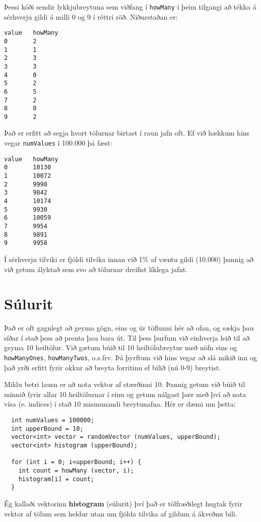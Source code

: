 Þessi kóði sendir lykkjubreytuna sem viðfang í {\tt howMany} í þeim tilgangi að tékka á sérhverju gildi á milli 0 og 9 í réttri röð.
Niðurstaðan er:

\begin{verbatim}
value   howMany
0       2
1       1
2       3
3       3
4       0
5       2
6       5
7       2
8       0
9       2
\end{verbatim}
%
Það er erfitt að segja hvort tölurnar birtast í raun jafn oft.
Ef við hækkum hins vegar {\tt numValues} í 100.000 þá fæst:

\begin{verbatim}
value   howMany
0       10130
1       10072
2       9990
3       9842
4       10174
5       9930
6       10059
7       9954
8       9891
9       9958
\end{verbatim}
%
Í sérhverju tilviki er fjöldi tilvika innan við 1\% af væntu gildi (10.000) þannig að við getum ályktað sem svo að tölurnar dreifist líklega jafnt.

\section {Súlurit}

Það er oft gagnlegt að geyma gögn, eins og úr töflunni hér að ofan, og sækja þau síðar í stað þess að prenta þau bara út.
Til þess þurfum við einhverja leið til að geyma 10 heiltölur.
Við gætum búið til 10 heiltölubreytur með nöfn eins og {\tt howManyOnes}, {\tt howManyTwos}, o.s.frv.
Þá þyrftum við hins vegar að slá mikið inn og það yrði erfitt fyrir okkur að breyta forritinu ef bilið (nú 0-9) breytist.

Miklu betri lausn er að nota vektor af stærðinni 10.
Þannig getum við búið til minnið fyrir allar 10 heiltölurnar í einu og getum nálgast þær með því að nota vísa (e. indices) í stað 10 mismunandi breytunafna.
Hér er dæmi um þetta:

\begin{verbatim}
  int numValues = 100000;
  int upperBound = 10;
  vector<int> vector = randomVector (numValues, upperBound);
  vector<int> histogram (upperBound);

  for (int i = 0; i<upperBound; i++) {
    int count = howMany (vector, i);
    histogram[i] = count;
  }
\end{verbatim}
%
Ég kallaði vektorinn {\bf histogram} (súlurit) því það er tölfræðilegt hugtak fyrir vektor af tölum sem heldur utan um fjölda tilvika af gildum á ákveðnu bili.

